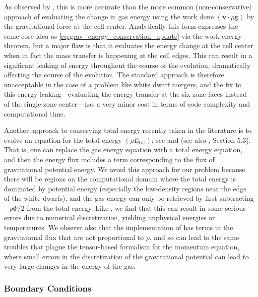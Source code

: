 \documentclass[iop]{../emulateapj}
\begin{document}
As observed by \cite{arepo}, this is more accurate than the more common (non-conservative) approach
of evaluating the change in gas energy using the work done $(\mathbf{v} \cdot \rho \mathbf{g})$
by the gravitational force at the cell center. Analytically this form expresses the same core idea as
\autoref{eq:grav_energy_conservation_update} via the work-energy theorem, but a major flaw is that
it evaluates the energy change at the cell center when in fact the mass transfer is happening at
the cell edges. This can result in a significant leaking of energy throughout the course of the
evolution, dramatically affecting the course of the evolution. The standard approach is therefore
unacceptable in the case of a problem like white dwarf mergers, and the fix to this energy
leaking---evaluating the energy transfer at the six zone faces instead of the single zone
center---has a very minor cost in terms of code complexity and computational time.

Another approach to conserving total energy recently taken in the literature is to evolve an 
equation for the total energy $(\rho E_{\text{tot}})$; see \cite{marcello:2012} and \cite{jiang:2013} (see also 
\cite{arepo}, Section 5.3). That is, one can replace the gas energy equation with a total energy equation, 
and then the energy flux includes a term corresponding to the flux of gravitational potential energy. We 
avoid this approach for our problem because there will be regions on the computational domain where the total 
energy is dominated by potential energy (especially the low-density regions near the edge of the white dwarfs),
and the gas energy can only be retrieved by first subtracting $-\rho \Phi/2$ from the total energy. Like 
\cite{arepo}, we find that this can result in some serious errors due to numerical discretization, yielding 
unphysical energies or temperatures. We observe also that the implementation of \cite{jiang:2013} 
has terms in the gravitational flux that are not proportional to $\rho$, and so can lead to the 
same troubles that plague the tensor-based formalism for the momentum equation, where small errors 
in the discretization of the gravitational potential can lead to very large changes in the energy of the gas.

\subsubsection{Boundary Conditions}\label{sec:gravity_boundary_conditions}
\end{document}
